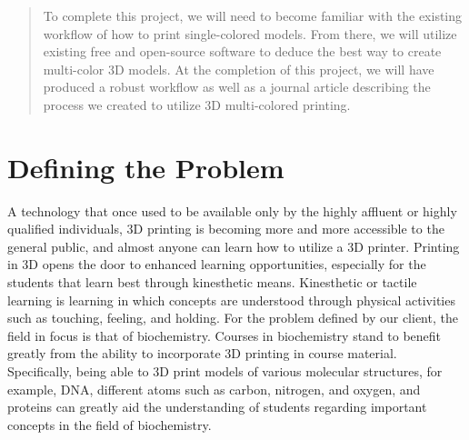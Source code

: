 \documentclass[onecolumn, draftclsnofoot,10pt, compsoc]{IEEEtran}
\begin{document}
\begin{titlepage}
\begin{singlespace}
\begin{abstract}
	    To complete this project, we will need to become familiar with the existing workflow of how to print single-colored models. 
	    From there, we will utilize existing free and open-source software to deduce the best way to create multi-color 3D models.
	    At the completion of this project, we will have produced a robust workflow as well as a journal article describing the process we created to utilize 3D multi-colored printing. 

        \end{abstract}     
    \end{singlespace}
\end{titlepage}
\newpage
{}
\tableofcontents
\clearpage


\section{Defining the Problem}
A technology that once used to be available only by the highly affluent or highly qualified individuals, 3D printing is becoming more and more accessible to the general public, and almost anyone can learn how to utilize a 3D printer. 
Printing in 3D opens the door to enhanced learning opportunities, especially for the students that learn best through kinesthetic means.
Kinesthetic or tactile learning is learning in which concepts are understood through physical activities such as touching, feeling, and holding. 
For the problem defined by our client, the field in focus is that of biochemistry. 
Courses in biochemistry stand to benefit greatly from the ability to incorporate 3D printing in course material. 
Specifically, being able to 3D print models of various molecular structures, for example, DNA, different atoms such as carbon, nitrogen, and oxygen, and proteins can greatly aid the understanding of students regarding important concepts in the field of biochemistry.
\end{document}
